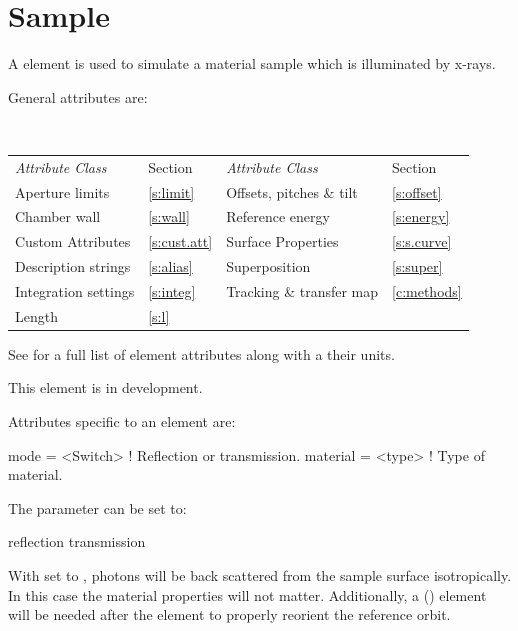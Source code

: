 {%
\section{Sample}
\label{s:sample}

A  element is used to simulate a material sample which is illuminated by x-rays.

General  attributes are:
\begin{center}
\tt
\begin{tabular}{llll} \toprule
  {\sl Attribute Class}      & Section           & {\sl Attribute Class}      & Section         \\
  Aperture limits            & \ref{s:limit}     & Offsets, pitches \& tilt   & \ref{s:offset}  \\ \midrule
  Chamber wall               & \ref{s:wall}      & Reference energy           & \ref{s:energy}  \\ 
  Custom Attributes          & \ref{s:cust.att}  & Surface Properties         & \ref{s:s.curve} \\
  Description strings        & \ref{s:alias}     & Superposition              & \ref{s:super}   \\
  Integration settings       & \ref{s:integ}     & Tracking \& transfer map   & \ref{c:methods} \\
  Length                     & \ref{s:l}         &                            &                 \\
  \bottomrule
\end{tabular}
\end{center}
\toffset
See  for a full list of element attributes along with a their units.

This element is in development.

Attributes specific to an  element are:
\begin{example}
  mode       = <Switch> ! Reflection or transmission.
  material   = <type>   ! Type of material. 
\end{example}

The  parameter can be set to:
\begin{example}
  reflection
  transmission
\end{example}
With  set to , photons will be back scattered
from the sample surface isotropically. In this case the material
properties will not matter. Additionally, a 
() element will be needed after the  element
to properly reorient the reference orbit.

}

